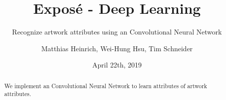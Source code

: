\documentclass[10pt,a4paper,twocolumn,DIV18]{scrartcl}
\title{Expos\'e - Deep Learning}
\subtitle{Recognize artwork attributes using an Convolutional Neural Network}
\author{Matthias Heinrich, Wei-Hung Hsu, Tim Schneider}
\date{April 22th, 2019}
\begin{document}
  

\maketitle
\begin{abstract}
We implement an Convolutional Neural Network to learn attributes of artwork attributes.
\end{abstract}

%






\end{document}
